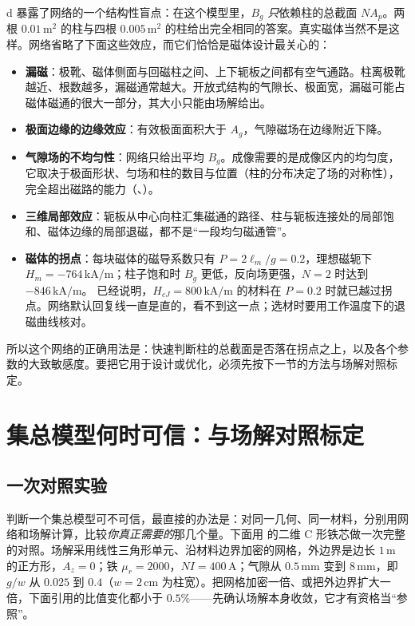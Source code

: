  d 暴露了网络的一个结构性盲点：在这个模型里，$B_g$ \emph{只}依赖柱的总截面 $NA_p$。两根 $0.01\,\mathrm{m^2}$ 的柱与四根 $0.005\,\mathrm{m^2}$ 的柱给出完全相同的答案。真实磁体当然不是这样。网络省略了下面这些效应，而它们恰恰是磁体设计最关心的：
\begin{itemize}
\item \textbf{漏磁}：极靴、磁体侧面与回磁柱之间、上下轭板之间都有空气通路。柱离极靴越近、根数越多，漏磁通常越大。开放式结构的气隙长、极面宽，漏磁可能占磁体磁通的很大一部分，其大小只能由场解给出。
\item \textbf{极面边缘的边缘效应}：有效极面面积大于 $A_g$，气隙磁场在边缘附近下降。
\item \textbf{气隙场的不均匀性}：网络只给出平均 $B_g$。成像需要的是成像区内的均匀度，它取决于极面形状、匀场和柱的数目与位置（柱的分布决定了场的对称性），完全超出磁路的能力（、）。
\item \textbf{三维局部效应}：轭板从中心向柱汇集磁通的路径、柱与轭板连接处的局部饱和、磁体边缘的局部退磁，都不是“一段均匀磁通管”。
\item \textbf{磁体的拐点}：每块磁体的磁导系数只有 $P=2\ell_m/g=0.2$，理想磁轭下 $H_m=-764\,\mathrm{kA/m}$；柱子饱和时 $B_g$ 更低，反向场更强，$N=2$ 时达到 $-846\,\mathrm{kA/m}$。 已经说明，$H_{cJ}=800\,\mathrm{kA/m}$ 的材料在 $P=0.2$ 时就已越过拐点。网络默认回复线一直是直的，看不到这一点；选材时要用工作温度下的退磁曲线核对。
\end{itemize}
所以这个网络的正确用法是：快速判断柱的总截面是否落在拐点之上，以及各个参数的大致敏感度。要把它用于设计或优化，必须先按下一节的方法与场解对照标定。

\section{集总模型何时可信：与场解对照标定}\label{sec:lumped-validity}

\subsection{一次对照实验}
判断一个集总模型可不可信，最直接的办法是：对同一几何、同一材料，分别用网络和场解计算，比较\emph{你真正需要的}那几个量。下面用 的二维 C 形铁芯做一次完整的对照。场解采用线性三角形单元、沿材料边界加密的网格，外边界是边长 $1\,\mathrm m$ 的正方形，$A_z=0$；铁 $\mu_r=2000$，$NI=400\,\mathrm A$；气隙从 $0.5\,\mathrm{mm}$ 变到 $8\,\mathrm{mm}$，即 $g/w$ 从 $0.025$ 到 $0.4$（$w=2\,\mathrm{cm}$ 为柱宽）。把网格加密一倍、或把外边界扩大一倍，下面引用的比值变化都小于 $0.5\%$——先确认场解本身收敛，它才有资格当“参照”。

